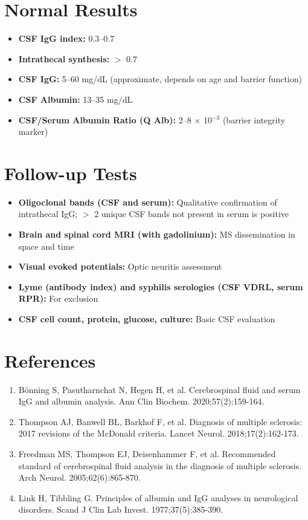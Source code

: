 \section*{Normal Results}
\begin{itemize}
  \item \textbf{CSF IgG index:} 0.3--0.7
  \item \textbf{Intrathecal synthesis:} $>$ 0.7
  \item \textbf{CSF IgG:} 5--60 mg/dL (approximate, depends on age and barrier function)
  \item \textbf{CSF Albumin:} 13--35 mg/dL
  \item \textbf{CSF/Serum Albumin Ratio (Q Alb):} 2--8 $\times$ 10$^{-3}$ (barrier integrity marker)
\end{itemize}

\section*{Follow-up Tests}
\begin{itemize}
  \item \textbf{Oligoclonal bands (CSF and serum):} Qualitative confirmation of intrathecal IgG; $>$ 2 unique CSF bands not present in serum is positive
  \item \textbf{Brain and spinal cord MRI (with gadolinium):} MS dissemination in space and time
  \item \textbf{Visual evoked potentials:} Optic neuritis assessment
  \item \textbf{Lyme (antibody index) and syphilis serologies (CSF VDRL, serum RPR):} For exclusion
  \item \textbf{CSF cell count, protein, glucose, culture:} Basic CSF evaluation
\end{itemize}

\section*{References}
\begin{enumerate}
  \item Bönning S, Pasutharnchat N, Hegen H, et al. Cerebrospinal fluid and serum IgG and albumin analysis. Ann Clin Biochem. 2020;57(2):159-164.
  \item Thompson AJ, Banwell BL, Barkhof F, et al. Diagnosis of multiple sclerosis: 2017 revisions of the McDonald criteria. Lancet Neurol. 2018;17(2):162-173.
  \item Freedman MS, Thompson EJ, Deisenhammer F, et al. Recommended standard of cerebrospinal fluid analysis in the diagnosis of multiple sclerosis. Arch Neurol. 2005;62(6):865-870.
  \item Link H, Tibbling G. Principles of albumin and IgG analyses in neurological disorders. Scand J Clin Lab Invest. 1977;37(5):385-390.
\end{enumerate}

\clearpage